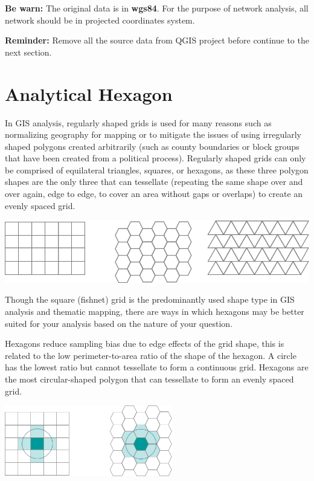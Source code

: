 \documentclass[
  letterpaper,
  DIV=11,
  numbers=noendperiod]{scrreprt}
\begin{document}
\textbf{Be warn:} The original data is in \textbf{wgs84}. For the
purpose of network analysis, all network should be in projected
coordinates system.

\textbf{Reminder:} Remove all the source data from QGIS project before
continue to the next section.

\hypertarget{analytical-hexagon}{%
\section{Analytical Hexagon}\label{analytical-hexagon}}

In GIS analysis, regularly shaped grids is used for many reasons such as
normalizing geography for mapping or to mitigate the issues of using
irregularly shaped polygons created arbitrarily (such as county
boundaries or block groups that have been created from a political
process). Regularly shaped grids can only be comprised of equilateral
triangles, squares, or hexagons, as these three polygon shapes are the
only three that can tessellate (repeating the same shape over and over
again, edge to edge, to cover an area without gaps or overlaps) to
create an evenly spaced grid.

\includegraphics{./img09/image1.png}

Though the square (fishnet) grid is the predominantly used shape type in
GIS analysis and thematic mapping, there are ways in which hexagons may
be better suited for your analysis based on the nature of your question.

Hexagons reduce sampling bias due to edge effects of the grid shape,
this is related to the low perimeter-to-area ratio of the shape of the
hexagon. A circle has the lowest ratio but cannot tessellate to form a
continuous grid. Hexagons are the most circular-shaped polygon that can
tessellate to form an evenly spaced grid.

\includegraphics[width=0.55\textwidth,height=\textheight]{./img09/image2.png}
\end{document}

